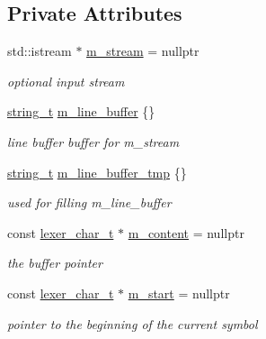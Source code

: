 \subsection*{Private Attributes}
\begin{DoxyCompactItemize}
\item 
std\+::istream $\ast$ \hyperlink{classnlohmann_1_1basic__json_1_1lexer_af71aa97e4a1f04c2b891856228f57cc4}{m\+\_\+stream} = nullptr
\begin{DoxyCompactList}\small\item\em optional input stream \end{DoxyCompactList}\item 
\hyperlink{classnlohmann_1_1basic__json_a61f8566a1a85a424c7266fb531dca005}{string\+\_\+t} \hyperlink{classnlohmann_1_1basic__json_1_1lexer_aeba256e545e3362795f90bf3aafe18d5}{m\+\_\+line\+\_\+buffer} \{\}
\begin{DoxyCompactList}\small\item\em line buffer buffer for m\+\_\+stream \end{DoxyCompactList}\item 
\hyperlink{classnlohmann_1_1basic__json_a61f8566a1a85a424c7266fb531dca005}{string\+\_\+t} \hyperlink{classnlohmann_1_1basic__json_1_1lexer_a6cab4622ed1fb6525a11e86ef789581d}{m\+\_\+line\+\_\+buffer\+\_\+tmp} \{\}
\begin{DoxyCompactList}\small\item\em used for filling m\+\_\+line\+\_\+buffer \end{DoxyCompactList}\item 
const \hyperlink{classnlohmann_1_1basic__json_1_1lexer_abe04be04d0575249f8806c334bacbc80}{lexer\+\_\+char\+\_\+t} $\ast$ \hyperlink{classnlohmann_1_1basic__json_1_1lexer_a3fdf69ff3f266c23ee351cde2ce44ad6}{m\+\_\+content} = nullptr
\begin{DoxyCompactList}\small\item\em the buffer pointer \end{DoxyCompactList}\item 
const \hyperlink{classnlohmann_1_1basic__json_1_1lexer_abe04be04d0575249f8806c334bacbc80}{lexer\+\_\+char\+\_\+t} $\ast$ \hyperlink{classnlohmann_1_1basic__json_1_1lexer_ace4ad69e8cd3f4686260b6e504f6a37e}{m\+\_\+start} = nullptr
\begin{DoxyCompactList}\small\item\em pointer to the beginning of the current symbol \end{DoxyCompactList}\item 

\end{DoxyCompactItemize}
